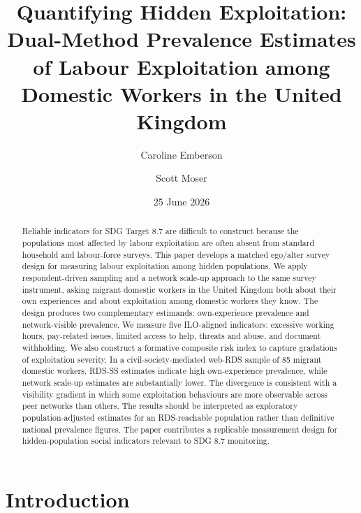 \documentclass[
  12pt,
  letterpaper,
  DIV=11,
  numbers=noendperiod]{scrartcl}
\title{Quantifying Hidden Exploitation: Dual-Method Prevalence Estimates
of Labour Exploitation among Domestic Workers in the United Kingdom}
\author{Caroline Emberson \and Scott Moser}
\date{25 June 2026}
\begin{document}
\maketitle
\begin{abstract}
Reliable indicators for SDG Target 8.7 are difficult to construct
because the populations most affected by labour exploitation are often
absent from standard household and labour-force surveys. This paper
develops a matched ego/alter survey design for measuring labour
exploitation among hidden populations. We apply respondent-driven
sampling and a network scale-up approach to the same survey instrument,
asking migrant domestic workers in the United Kingdom both about their
own experiences and about exploitation among domestic workers they know.
The design produces two complementary estimands: own-experience
prevalence and network-visible prevalence. We measure five ILO-aligned
indicators: excessive working hours, pay-related issues, limited access
to help, threats and abuse, and document withholding. We also construct
a formative composite risk index to capture gradations of exploitation
severity. In a civil-society-mediated web-RDS sample of 85 migrant
domestic workers, RDS-SS estimates indicate high own-experience
prevalence, while network scale-up estimates are substantially lower.
The divergence is consistent with a visibility gradient in which some
exploitation behaviours are more observable across peer networks than
others. The results should be interpreted as exploratory
population-adjusted estimates for an RDS-reachable population rather
than definitive national prevalence figures. The paper contributes a
replicable measurement design for hidden-population social indicators
relevant to SDG 8.7 monitoring.
\end{abstract}


\section{Introduction}\label{introduction}
\end{document}
